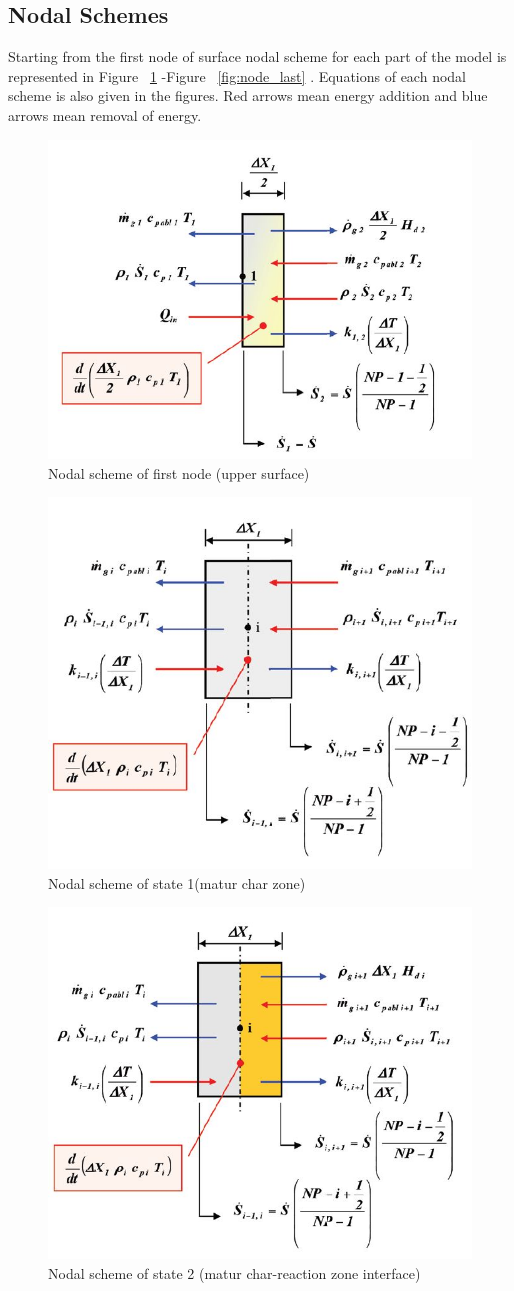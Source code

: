 \documentclass[a4paper, 12pt]{article} %
\begin{document}
\subsection{Nodal Schemes}
Starting from the first node of surface nodal scheme for each part of the model is represented in Figure ~\ref{fig:node_1} -Figure ~\ref{fig:node_last} \cite{mazz}. Equations of each nodal scheme is also given in the figures. Red arrows mean energy addition and blue arrows mean removal of energy.
\begin{figure}[h!]
  \centering
  \includegraphics[width=0.6 \linewidth]{node_1.jpg}
  \caption{Nodal scheme of first node (upper surface)}
  \label{fig:node_1}
\end{figure}
\begin{figure}[h!]
  \centering
  \includegraphics[width=0.6 \linewidth]{matur_nodal.jpg}
  \caption{Nodal scheme of state 1(matur char zone)}
  \label{fig:matur}
\end{figure}
\begin{figure}[h!]
  \centering
  \includegraphics[width=0.7 \linewidth]{matur_react.jpg}
  \caption{Nodal scheme of state 2 (matur char-reaction zone interface)}
  \label{fig:mr}
\end{figure}
\end{document}
